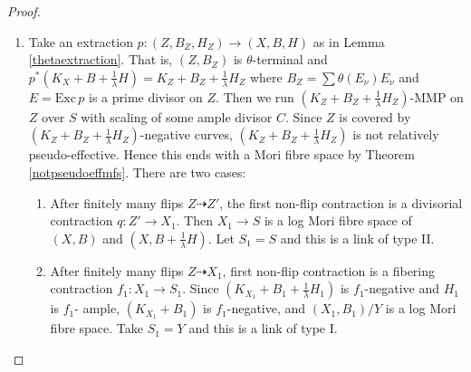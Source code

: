 \documentclass{article}
\begin{document}
\begin{proof}
\begin{enumerate}
\begin{enumerate}
  \end{enumerate}
\item\label{b}Take  an extraction $ p:(Z,B_Z,H_Z)\to (X,B,H) $ as in Lemma \ref{thetaextraction}. That is,  $ (Z,B_Z) $ is $ \theta $-terminal and $ p^*(K_X+B+\frac{1}{\lambda}H)=K_Z+B_Z+\frac{1}{\lambda}H_Z $ where $ B_Z=\sum\theta(E_\nu)E_\nu $ and $ E=\mathrm{Exc}\,p $ is a prime divisor on $ Z $.
  Then we run $ (K_Z+B_Z+\frac{1}{\lambda}H_Z) $-MMP on $ Z $ over $ S $ with scaling of some ample divisor $C$. Since $Z$ is covered by $ (K_Z+B_Z+\frac{1}{\lambda}H_Z) $-negative curves, $ (K_Z+B_Z+\frac{1}{\lambda}H_Z) $ is not relatively pseudo-effective. Hence this  ends with a Mori fibre space by Theorem \ref{notpseudoeffmfs}. There are two cases:
  \begin{enumerate}
    \item \label{b1}After finitely many flips $ Z\dashrightarrow Z' $, the first non-flip contraction is a divisorial contraction $ q:Z'\to X_1 $. Then $ X_{1}\to S $ is a log Mori fibre space of $(X,B)$ and $(X,B+\frac{1}{\lambda}H)$.  Let $ S_1=S $ and this is a link of type II.
    \item\label{b2}After finitely many flips $ Z\dashrightarrow X_1 $, first non-flip contraction is a fibering contraction $ f_1:X_1\to S_{1}$. Since $ (K_{X_1}+B_1+\frac{1}{\lambda}H_1) $ is $ f_1 $-negative and $ H_1 $ is $ f_1 $- ample, $ (K_{X_1}+B_1) $ is $ f_1 $-negative, and $ (X_1,B_1)/Y $ is a log Mori fibre space.  Take $ S_1=Y $ and this is a link of type I.
  \end{enumerate} 
\end{enumerate}
\end{proof}
\end{document}
